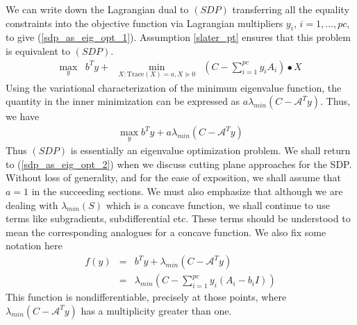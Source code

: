 \documentclass[12pt]{kluwer}
\begin{document}
\begin{article}
We can write down the Lagrangian dual to $(SDP)$ transferring all the equality constraints
into the objective function via Lagrangian multipliers $y_i$, $i=1,\ldots,pc$, to give (\ref{sdp_as_eig_opt_1}).
Assumption \ref{slater_pt} ensures that this problem is equivalent to $(SDP)$.
\begin{equation}
\label{sdp_as_eig_opt_1}
\begin{array}{lrcc}
\max_y & b^Ty + & \min_{X : \mbox{Trace}(X) = a, X \succeq 0} & (C - \sum_{i=1}^{pc}y_iA_i) \bullet X 
\end{array}
\end{equation}
Using the variational characterization of the minimum eigenvalue function, the quantity in the inner minimization 
can be expressed as $a \lambda_{min}(C - \mathcal{A}^Ty)$. Thus, we have
\begin{equation}
\label{sdp_as_eig_opt_2}
\begin{array}{ccc}
\max_y b^Ty + a \lambda_{min}(C - \mathcal{A}^Ty)
\end{array}
\end{equation}
Thus $(SDP)$ is essentially an eigenvalue optimization problem. We shall return to (\ref{sdp_as_eig_opt_2}) when we discuss
cutting plane approaches for the SDP. Without loss of generality, and for the ease of exposition, we shall
assume that $a=1$ in the succeeding sections. We must also emphasize that although we are dealing
with $\lambda_{min}(S)$ which is a concave function, we shall continue to use terms like subgradients,
subdifferential etc. These terms should be understood to mean the corresponding analogues for a concave function.
We also fix some notation here
\begin{displaymath}
\begin{array}{ccc}
f(y) & = & b^Ty + \lambda_{min}(C-\mathcal{A}^Ty) \\
& = & \lambda_{min}(C-\sum_{i=1}^{pc}y_i(A_i-b_iI))
\end{array}
\end{displaymath}
This function is nondifferentiable, precisely at those points, where $\lambda_{min}(C-\mathcal{A}^Ty)$
has a multiplicity greater than one.


\end{article}
\end{document}
